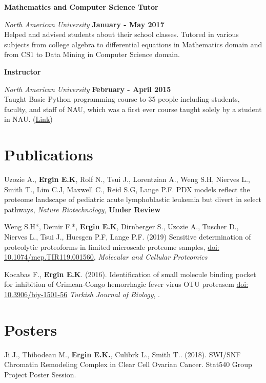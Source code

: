 \documentclass[margin,line]{res}
\begin{document}
\begin{resume}
{\bf Mathematics and Computer Science Tutor}
\vspace{-.1cm}

{\em North American University} \hfill {\bf January - May 2017}\\
Helped and advised students about their school classes. Tutored in various subjects from college algebra to differential equations in Mathematics domain and from CS1 to Data Mining in Computer Science domain.

{\bf Instructor}
\vspace{-.1cm}

{\em North American University} \hfill {\bf February - April 2015}\\
Taught Basic Python programming course to 35 people including students, faculty, and staff of NAU, which was a first ever course taught solely by a student in NAU. (\href{https://github.com/NAU-Python-Class/Py101-Spring-15}{Link})


\section{\sc Publications}
Uzozie A., {\bf Ergin E.K}, Rolf N., Tsui J., Lorentzian A., Weng S.H,  Nierves L., Smith T., Lim C.J,  Maxwell C., Reid S.G, Lange P.F. PDX models reflect the proteome landscape of pediatric acute lymphoblastic leukemia but divert in select pathways, {\em Nature Biotechnology}, {\bf Under Review}

Weng S.H*, Demir F.*, {\bf Ergin E.K}, Dirnberger S., Uzozie A., Tuscher D., Nierves L., Tsui J., Huesgen P.F, Lange P.F. (2019) Sensitive determination of proteolytic proteoforms in limited microscale proteome samples, \href{https://doi.org/10.1074/mcp.TIR119.001560}{doi: 10.1074/mcp.TIR119.001560}, {\em Molecular and Cellular Proteomics}

Kocabas F., {\bf Ergin E.K}. (2016). Identification of small molecule binding pocket for inhibition of Crimean-Congo hemorrhagic fever virus OTU proteasem \href{https://www.researchgate.net/profile/Fatih_Kocabas/publication/284188739_Identification_of_small_molecule_binding_pocket_for_inhibition_of_Crimean-Congo_hemorrhagic_fever_virus_OTU_protease/links/564f6a0b08aefe619b11de98.pdf}{doi: 10.3906/biy-1501-56} {\em Turkish Journal of Biology}, .

\section{\sc Posters}
Ji J., Thibodeau M., {\bf Ergin E.K.}, Culibrk L., Smith T.. (2018). SWI/SNF Chromatin Remodeling Complex in Clear Cell Ovarian Cancer. Stat540 Group Project Poster Session.


\end{resume}
\end{document}
